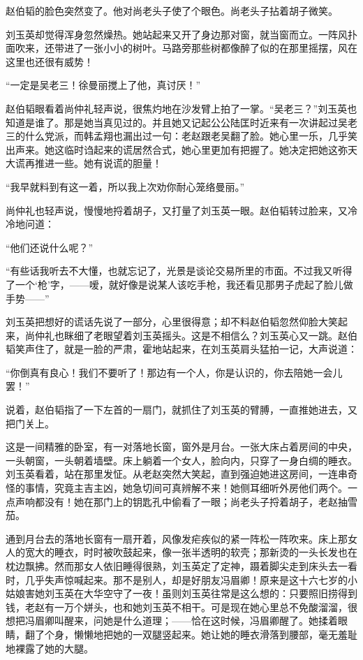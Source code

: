 \par 赵伯韬的脸色突然变了。他对尚老头子使了个眼色。尚老头子拈着胡子微笑。
\par 刘玉英却觉得浑身忽然燥热。她站起来又开了身边那对窗，就当窗而立。一阵风扑面吹来，还带进了一张小小的树叶。马路旁那些树都像醉了似的在那里摇摆，风在这里也还很有威势！
\par “一定是吴老三！徐曼丽搅上了他，真讨厌！”
\par 赵伯韬眼看着尚仲礼轻声说，很焦灼地在沙发臂上拍了一掌。“吴老三？”刘玉英也知道是谁了。那是她当真见过的。并且她又记起公公陆匡时近来有一次讲起过吴老三的什么党派，而韩孟翔也漏出过一句：老赵跟老吴翻了脸。她心里一乐，几乎笑出声来。她这临时诌起来的谎居然合式，她心里更加有把握了。她决定把她这弥天大谎再推进一些。她有说谎的胆量！
\par “我早就料到有这一着，所以我上次劝你耐心笼络曼丽。”
\par 尚仲礼也轻声说，慢慢地捋着胡子，又打量了刘玉英一眼。赵伯韬转过脸来，又冷冷地问道：
\par “他们还说什么呢？”
\par “有些话我听去不大懂，也就忘记了，光景是谈论交易所里的市面。不过我又听得了一个‘枪’字，——嗳，就好像是说某人该吃手枪，我还看见那男子虎起了脸儿做手势——”
\par 刘玉英把想好的谎话先说了一部分，心里很得意；却不料赵伯韬忽然仰脸大笑起来，尚仲礼也眯细了老眼望着刘玉英摇头。这是不相信么？刘玉英心又一跳。赵伯韬笑声住了，就是一脸的严肃，霍地站起来，在刘玉英肩头猛拍一记，大声说道：
\par “你倒真有良心！我们不要听了！那边有一个人，你是认识的，你去陪她一会儿罢！”
\par 说着，赵伯韬指了一下左首的一扇门，就抓住了刘玉英的臂膊，一直推她进去，又把门关上。
\par 这是一间精雅的卧室，有一对落地长窗，窗外是月台。一张大床占着房间的中央，一头朝窗，一头朝着墙壁。床上躺着一个女人，脸向内，只穿了一身白绸的睡衣。刘玉英看着，站在那里发怔。从老赵突然大笑起，直到强迫她进这房间，一连串奇怪的事情，究竟主吉主凶，她急切间可真辨解不来！她侧耳细听外房他们两个。一点声响都没有！她在那门上的钥匙孔中偷看了一眼；尚老头子捋着胡子，老赵抽雪茄。
\par 通到月台去的落地长窗有一扇开着，风像发疟疾似的紧一阵松一阵吹来。床上那女人的宽大的睡衣，时时被吹鼓起来，像一张半透明的软壳；那新烫的一头长发也在枕边飘拂。然而那女人依旧睡得很熟，刘玉英定了定神，蹑着脚尖走到床头去一看时，几乎失声惊喊起来。那不是别人，却是好朋友冯眉卿！原来是这十六七岁的小姑娘害她刘玉英在大华空守了一夜！虽则刘玉英往常是这么想的：只要照旧捞得到钱，老赵有一万个姘头，也和她刘玉英不相干。可是现在她心里总不免酸溜溜，很想把冯眉卿叫醒来，问她是什么道理；——恰在这时候，冯眉卿醒了。她揉着眼睛，翻了个身，懒懒地把她的一双腿竖起来。她让她的睡衣滑落到腰部，毫无羞耻地裸露了她的大腿。
